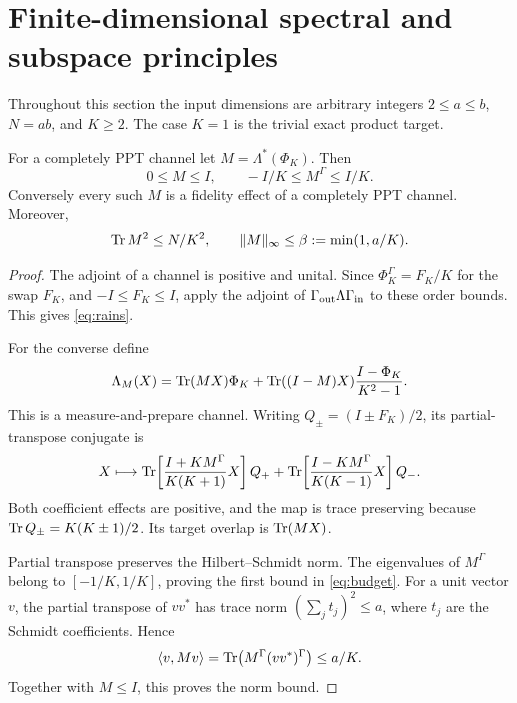 \section{Finite-dimensional spectral and subspace principles}\label{sec:spectral}

Throughout this section the input dimensions are arbitrary integers $2\le a\le b$, $N=ab$, and $K\ge2$. The case $K=1$ is the trivial exact product target.

\begin{lemma}\label{lem:rains}
For a completely PPT channel let $M=\Lambda^*(\Phi_K)$. Then
\begin{equation}\label{eq:rains}
 0\le M\le I,\qquad -I/K\le M^\Gamma\le I/K.
\end{equation}
Conversely every such $M$ is a fidelity effect of a completely PPT channel. Moreover,
\begin{equation}\label{eq:budget}
 \operatorname{Tr} M^2\le N/K^2,\qquad
 \|M\|_\infty\le\beta:=\min(1,a/K).
\end{equation}
\end{lemma}
\begin{proof}
The adjoint of a channel is positive and unital. Since $\Phi_K^\Gamma=F_K/K$ for the swap $F_K$, and $-I\le F_K\le I$, apply the adjoint of $\Gamma_{\rm out}\Lambda\Gamma_{\rm in}$ to these order bounds. This gives \eqref{eq:rains}.

For the converse define
\[
 \Lambda_M(X)=\operatorname{Tr}(MX)\Phi_K+
 \operatorname{Tr}((I-M)X)\frac{I-\Phi_K}{K^2-1}.
\]
This is a measure-and-prepare channel. Writing $Q_\pm=(I\pm F_K)/2$, its partial-transpose conjugate is
\[
 X\longmapsto
 \operatorname{Tr}\!\left[\frac{I+KM^\Gamma}{K(K+1)}X\right]Q_+
 +\operatorname{Tr}\!\left[\frac{I-KM^\Gamma}{K(K-1)}X\right]Q_-.
\]
Both coefficient effects are positive, and the map is trace preserving because $\operatorname{Tr} Q_\pm=K(K\pm1)/2$. Its target overlap is $\operatorname{Tr}(MX)$.

Partial transpose preserves the Hilbert--Schmidt norm. The eigenvalues of $M^\Gamma$ belong to $[-1/K,1/K]$, proving the first bound in \eqref{eq:budget}. For a unit vector $v$, the partial transpose of $vv^*$ has trace norm $(\sum_j t_j)^2\le a$, where $t_j$ are the Schmidt coefficients. Hence
\[
 \langle v,Mv\rangle
 =\operatorname{Tr}\bigl(M^\Gamma(vv^*)^\Gamma\bigr)\le a/K.
\]
Together with $M\le I$, this proves the norm bound.
\end{proof}

